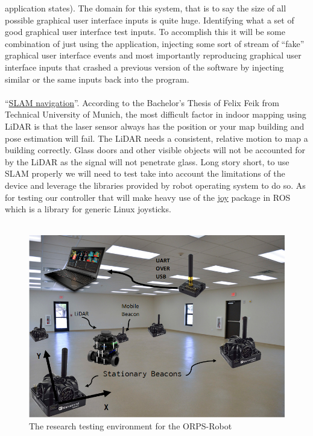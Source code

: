 \documentclass[english,12pt]{article}
\begin{document}
application states). The domain for this system, that is to say the size of all possible graphical 
user interface inputs is quite huge. Identifying what a set of good graphical user interface test
inputs. To accomplish this it will be some combination of just using the application, injecting some sort of 
stream of ``fake'' graphical user interface events and most importantly reproducing graphical user interface 
inputs that crashed a previous version of the software by injecting similar or the same inputs back into 
the program.
\\\\
``\href{https://husarion.com/tutorials/ros-tutorials/6-slam-navigation/}{SLAM navigation}''. 
According to the Bachelor's Thesis of Felix Feik from Technical University of Munich,
the most difficult factor in indoor mapping using LiDAR is that the laser sensor always has 
the position or your map building and pose estimation will fail. The LiDAR needs a consistent, 
relative motion to map a building correctly. Glass doors and other visible objects will not 
be accounted for by the LiDAR as the signal will not penetrate glass. Long story short, to use 
SLAM properly we will need to test take into account the limitations of the device and leverage 
the libraries provided by robot operating system to do so. As for testing our controller that will make heavy use of the 
\href{http://wiki.ros.org/joy#Microsoft_Xbox_360_Wired_Controller_for_Linux}{joy} 
package in ROS which is a library for generic Linux joysticks. \\\\
\begin{figure}[h!]
    \centerline{\includegraphics[width = \textwidth]{beacons.jpg}}
    \caption{The research testing environment for the ORPS-Robot}
\end{figure}
\end{document}
